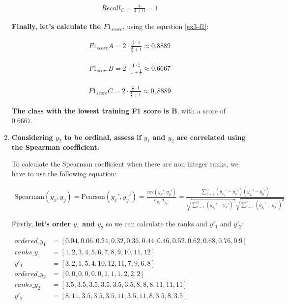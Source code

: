 \documentclass[12pt]{article}
\begin{document}
\begin{enumerate}[leftmargin=\labelsep]
    \[
        \begin{aligned}
            Recall_C = \frac{4}{4+0} = 1
        \end{aligned}
    \]

    \textbf{Finally, let's calculate the $F1_{score}$}, using the equation \eqref{ex3-f1}:

    \[
        \begin{aligned}
            F1_{score} A = 2 \cdot \frac{{ \frac{4}{5} \cdot 1 }}{{ \frac{4}{5} + 1 }} \approx 0.8889
        \end{aligned}
    \]

    \[
        \begin{aligned}
            F1_{score} B = 2 \cdot \frac{{ 1 \cdot \frac{1}{2} }}{{ 1 + \frac{1}{2} }} \approx 0.6667
        \end{aligned}
    \]

    \[
        \begin{aligned}
            F1_{score} C = 2 \cdot \frac{{ \frac{4}{5} \cdot 1 }}{{ \frac{4}{5} + 1 }} \approx 0,8889
        \end{aligned}
    \]

    \textbf{The class with the lowest training F1 score is B}, with a score of 0.6667.

    \item \textbf{Considering $y_2$ to be ordinal, assess if $y_1$ and $y_2$ are correlated using the Spearman coefficient.}

    \vskip 0.3cm

    To calculate the Spearman coefficient when there are non integer ranks, we have to use the following equation:

    \begin{equation}\label{ex4-sp}
        \begin{split}
            \text{Spearman}(y_x, y_y) = \text{Pearson}(y_x', y_y') = \frac{\text{cov}(y_x', y_y')}{\sigma_{y_x'} \sigma_{y_y'}}
            = \frac{\sum_{i=1}^{n} (y_{x_i}' - \bar{y_x'})(y_{y_i}' - \bar{y_y'})}{\sqrt{\sum_{i=1}^{n} (y_{x_i}' - \bar{y_x'})^2}\sqrt{\sum_{i=1}^{n} (y_{y_i}' - \bar{y_y'})^2}}
        \end{split}
    \end{equation}

    Firstly, \textbf{let's order $y_1$ and $y_2$} so we can calculate the ranks and $y'_1$ and $y'_2$:

    \begin{align*}
        ordered\_y_{1} & = [0.04, 0.06, 0.24, 0.32, 0.36, 0.44, 0.46, 0.52, 0.62, 0.68, 0.76, 0.9]\\
        ranks\_y_{1}   & = [1,2,3,4,5,6,7,8,9,10,11,12]\\
        y'_{1}         & = [3,2,1,5,4,10,12,11,7,9,6,8]\\
        ordered\_y_{2} & = [0,0,0,0,0,0,1,1,1,2,2,2]\\
        ranks\_y_{2}   & = [3.5, 3.5, 3.5, 3.5, 3.5, 3.5, 8, 8, 8, 11, 11, 11]\\
        y'_{2}         & = [8, 11, 3.5, 3.5, 3.5, 11, 3.5, 11, 8, 3.5, 8, 3.5]
    \end{align*}


\end{enumerate}
\end{document}
